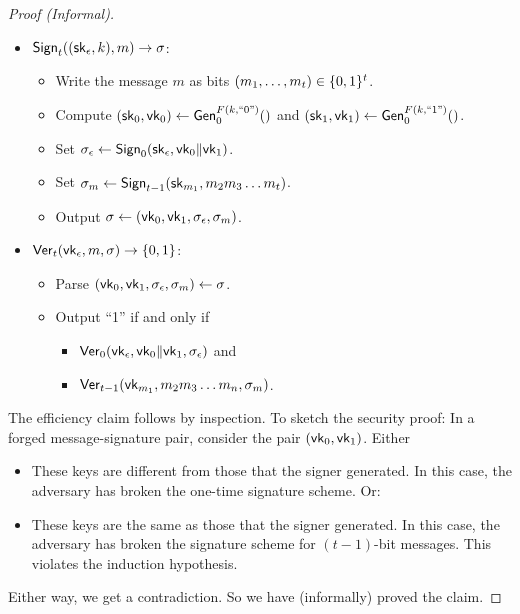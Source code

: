 \begin{proof}[Proof (Informal)]
\begin{framed}
\begin{itemize}
  \item $\mathsf{Sign}_t(({\mathsf{sk}}_\epsilon, k), m) \to \sigma$: 
    \begin{itemize}
      \item Write the message $m$ as bits $(m_1, \dots, m_t) \in \{0,1\}^t$.
      \item Compute $({\mathsf{sk}}_0, \mathsf{vk}_0) \gets \mathsf{Gen}_0^{F(k, \text{``0''})}()$
      and $({\mathsf{sk}}_1, \mathsf{vk}_1) \gets \mathsf{Gen}_0^{F(k, \text{``1''})}()$.
      \item Set $\sigma_\epsilon \gets \mathsf{Sign}_0({\mathsf{sk}}_\epsilon, \mathsf{vk}_0 \| \mathsf{vk}_1)$.
      \item Set $\sigma_m \gets \mathsf{Sign}_{t-1}({\mathsf{sk}}_{m_1}, m_{2}m_3 \dots m_t)$.
      \item Output $\sigma \gets (\mathsf{vk}_0, \mathsf{vk}_1, \sigma_\epsilon, \sigma_m)$.
    \end{itemize}
  \item $\mathsf{Ver}_t(\mathsf{vk}_\epsilon, m, \sigma) \to \{0,1\}$:
    \begin{itemize}
      \item Parse $(\mathsf{vk}_0, \mathsf{vk}_1, \sigma_\epsilon, \sigma_m) \gets \sigma$.
      \item Output ``1'' if and only if 
        \begin{itemize}
          \item $\mathsf{Ver}_0(\mathsf{vk}_\epsilon, \mathsf{vk}_0 \| \mathsf{vk}_1, \sigma_\epsilon)$
        and 
      \item $\mathsf{Ver}_{t-1}(\mathsf{vk}_{m_1}, m_2m_3\dots m_n, \sigma_m)$.
        \end{itemize}
    \end{itemize}
\end{itemize}
\end{framed}

The efficiency claim follows by inspection.
To sketch the security proof: 
In a forged message-signature pair, consider
the pair $(\mathsf{vk}_0,\mathsf{vk}_1)$. Either 
\begin{itemize}
  \item These keys are different from those that the signer generated.
        In this case, the adversary has broken the one-time signature scheme. Or:
  \item These keys are the same as those that the signer generated.
        In this case, the adversary has broken the signature 
        scheme for $(t-1)$-bit messages. This violates the induction hypothesis.
\end{itemize}
Either way, we get a contradiction.
So we have (informally) proved the claim.
\end{proof}
\iffalse


